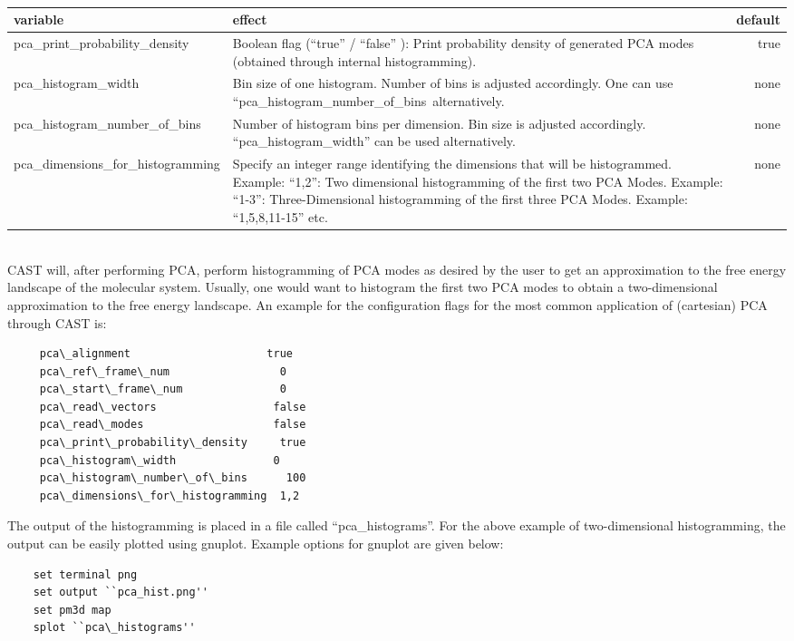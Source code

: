 \documentclass[10pt,a4paper]{article} %
\begin{document}
		~\\
		\begin{tabularx}{\textwidth}{l|X|r}
		variable & effect & default\\
		\hline
		pca\_print\_probability\_density & Boolean flag (``true'' / ``false'' ): Print probability density of generated PCA modes (obtained through internal histogramming). & true\\
		pca\_histogram\_width & Bin size of one histogram. Number of bins is adjusted accordingly. One can use ``pca\_histogram\_number\_of\_bins\ alternatively. & none\\
		pca\_histogram\_number\_of\_bins & Number of histogram bins per dimension. Bin size is adjusted accordingly. ``pca\_histogram\_width'' can be used alternatively. & none\\
		pca\_dimensions\_for\_histogramming & Specify an integer range identifying the dimensions that will be histogrammed. Example: ``1,2'': Two dimensional histogramming of the first two \ac{PCA} Modes. Example: ``1-3'': Three-Dimensional histogramming of the first three \ac{PCA} Modes. Example: ``1,5,8,11-15'' etc. & none\\
		
	\end{tabularx}~\\
		
	 \ac{CAST} will, after performing \ac{PCA}, perform histogramming of \ac{PCA} modes as desired by the user to get an approximation to the free energy landscape of the molecular system. Usually, one would want to histogram the first two \ac{PCA} modes to obtain a two-dimensional approximation to the free energy landscape. An example for the configuration flags for the most common application of (cartesian) \ac{PCA} through \ac{CAST} is:\\
	 
	 \begin{lstlisting}
	 pca\_alignment                     true
	 pca\_ref\_frame\_num                 0
	 pca\_start\_frame\_num               0
	 pca\_read\_vectors                  false
	 pca\_read\_modes                    false
	 pca\_print\_probability\_density     true
	 pca\_histogram\_width               0
	 pca\_histogram\_number\_of\_bins      100
	 pca\_dimensions\_for\_histogramming  1,2\end{lstlisting}
	 
	 The output of the histogramming is placed in a file called ``pca\_histograms''. For the above example of two-dimensional histogramming, the output can be easily plotted using gnuplot\cite{gnuplot_4.4}. Example options for gnuplot are given below:\\
	 \begin{lstlisting}
	set terminal png
	set output ``pca_hist.png''
	set pm3d map
	splot ``pca\_histograms''\end{lstlisting}~\\	
	
\end{document}
